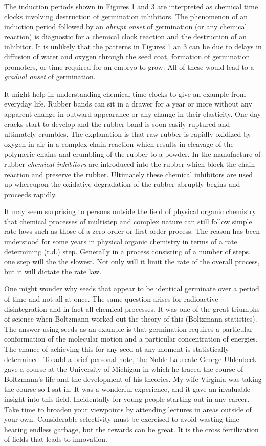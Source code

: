 The induction periods shown in Figures 1 and 3 are interpreted as chemical
time clocks involving destruction of germination inhibitors. The phenomenon of an
induction period followed by an \textit{abrupt onset} of germination (or any chemical reaction)
is diagnostic for a chemical clock reaction and the destruction of an inhibitor. It is
unlikely that the patterns in Figures 1 an 3 can be due to delays in diffusion of water
and oxygen through the seed coat, formation of germination promoters, or time
required for an embryo to grow. All of these would lead to a \textit{gradual onset} of
germination.

It might help in understanding chemical time clocks to give an example from
everyday life. Rubber bands can sit in a drawer for a year or more without any
apparent change in outward appearance or any change in their elasticity. One day
cracks start to develop and the rubber band is soon easily ruptured and ultimately
crumbles. The explanation is that raw rubber is rapidly oxidized by oxygen in air in a
complex chain reaction which results in cleavage of the polymeric chains and
crumbling of the rubber to a powder. In the manufacture of rubber \textit{chemical inhibitors}
are introduced into the rubber which block the chain reaction and preserve the rubber.
Ultimately these chemical inhibitors are used up whereupon the oxidative degradation
of the rubber abruptly begins and proceeds rapidly.

It may seem surprising to persons outside the field of physical organic chemistry
that chemical processes of multistep and complex nature can still follow simple rate
laws such as those of a zero order or first order process. The reason has been
understood for some years in physical organic chemistry in terms of a rate determining
(r.d.) step. Generally in a process consisting of a number of steps, one step will the the
slowest. Not only will it limit the rate of the overall process, but it will dictate the rate
law.

One might wonder why seeds that appear to be identical germinate over a
period of time and not all at once. The same question arises for radioactive
disintegration and in fact all chemical processes. It was one of the great triumphs of
science when Boltzmann worked out the theory of this (Boltzmann statistics). The
answer using seeds as an example is that germination requires a particular
conformation of the molecular motion and a particular concentration of energies. The
chance of achieving this for any seed at any moment is statistically determined. To
add a brief personal note, the Noble Laureate George Uhlenbeck gave a course at the
University of Michigan in which he traced the course of Boltzmann's life and the
development of his theories. My wife Virginia was taking the course so I sat in. It was
a wonderful experience, and it gave an invaluable insight into this field.
Incidentally for young people starting out in any career. Take time to broaden
your viewpoints by attending lectures in areas outside of your own. Considerable
selectivity must be exercised to avoid wasting time hearing endless garbage, but the
rewards can be great. It is the cross fertilization of fields that leads to innovation.

